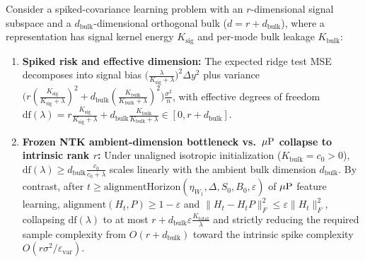 \begin{lemma}\label{lem:spiked_sample_complexity}
\leanok
{}
Consider a spiked-covariance learning problem with an $r$-dimensional signal subspace and a $d_{\mathrm{bulk}}$-dimensional orthogonal bulk ($d = r + d_{\mathrm{bulk}}$), where a representation has signal kernel energy $K_{\mathrm{sig}}$ and per-mode bulk leakage $K_{\mathrm{bulk}}$:
\begin{enumerate}
\item \textbf{Spiked risk and effective dimension:} The expected ridge test MSE decomposes into signal bias $\bigl(\frac{\lambda}{K_{\mathrm{sig}}+\lambda}\bigr)^2\Delta y^2$ plus variance $\bigl(r(\frac{K_{\mathrm{sig}}}{K_{\mathrm{sig}}+\lambda})^2 + d_{\mathrm{bulk}}(\frac{K_{\mathrm{bulk}}}{K_{\mathrm{bulk}}+\lambda})^2\bigr)\frac{\sigma^2}{n}$, with effective degrees of freedom $\mathrm{df}(\lambda) = r\frac{K_{\mathrm{sig}}}{K_{\mathrm{sig}}+\lambda} + d_{\mathrm{bulk}}\frac{K_{\mathrm{bulk}}}{K_{\mathrm{bulk}}+\lambda} \in [0, r + d_{\mathrm{bulk}}]$.
\item \textbf{Frozen NTK ambient-dimension bottleneck vs.\ $\mu\mathrm{P}$ collapse to intrinsic rank $r$:} Under unaligned isotropic initialization ($K_{\mathrm{bulk}} = c_0 > 0$), $\mathrm{df}(\lambda) \ge d_{\mathrm{bulk}}\frac{c_0}{c_0+\lambda}$ scales linearly with the ambient bulk dimension $d_{\mathrm{bulk}}$. By contrast, after $t \ge \mathrm{alignmentHorizon}(\eta_{W_1}, \Delta, S_0, B_0, \varepsilon)$ of $\mu\mathrm{P}$ feature learning, $\mathrm{alignment}(H_t, P) \ge 1-\varepsilon$ and $\|H_t - H_t P\|_F^2 \le \varepsilon\|H_t\|_F^2$, collapsing $\mathrm{df}(\lambda)$ to at most $r + d_{\mathrm{bulk}}\varepsilon\frac{K_{\mathrm{total}}}{\lambda}$ and strictly reducing the required sample complexity from $O(r + d_{\mathrm{bulk}})$ toward the intrinsic spike complexity $O(r\sigma^2/\varepsilon_{\mathrm{var}})$.
\end{enumerate}
\end{lemma}
